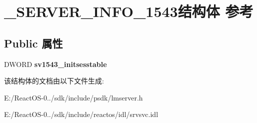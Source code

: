 \hypertarget{struct___s_e_r_v_e_r___i_n_f_o__1543}{}\section{\+\_\+\+S\+E\+R\+V\+E\+R\+\_\+\+I\+N\+F\+O\+\_\+1543结构体 参考}
\label{struct___s_e_r_v_e_r___i_n_f_o__1543}
\subsection*{Public 属性}
\begin{DoxyCompactItemize}
\item 
\mbox{\label{struct___s_e_r_v_e_r___i_n_f_o__1543_a7c8448d5d8acb322da2cae2d52e95fbd}} 
D\+W\+O\+RD {\bfseries sv1543\+\_\+initsesstable}
\end{DoxyCompactItemize}


该结构体的文档由以下文件生成\+:\begin{DoxyCompactItemize}
\item 
E\+:/\+React\+O\+S-\/0../sdk/include/psdk/lmserver.\+h\item 
E\+:/\+React\+O\+S-\/0../sdk/include/reactos/idl/srvsvc.\+idl\end{DoxyCompactItemize}
